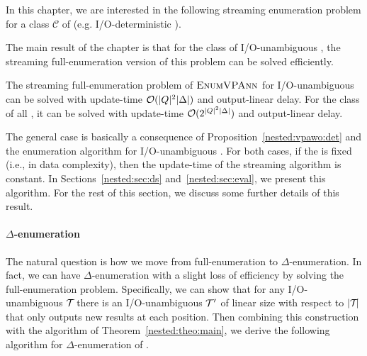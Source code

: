  
In this chapter, we are interested in the following streaming enumeration problem for a class $\mathcal{C}$ of \vpann (e.g. I/O-deterministic \vpann).
\begin{center}
\end{center}
The main result of the chapter is that for the class of I/O-unambiguous \vpann, the streaming full-enumeration version of this problem can be solved efficiently. %
\begin{theorem}\label{nested:theo:main}
	The streaming full-enumeration problem of $\textsc{EnumVPAnn}$ for I/O-unambiguous \vpann can be solved with update-time $\mathcal{O}(|Q|^2\vert\Delta\vert)$ and output-linear delay. For the class of all \vpann, it can be solved with update-time $\mathcal{O}(2^{|Q|^2\vert\Delta\vert})$ and output-linear \nolinebreak delay. 
\end{theorem} 
The general case is basically a consequence of Proposition~\ref{nested:vpawo:det} and the enumeration algorithm for I/O-unambiguous \vpann. For both cases, if the \vpann is fixed (i.e., in data complexity), then the update-time of the streaming algorithm is constant. In Sections~\ref{nested:sec:ds} and~\ref{nested:sec:eval}, we present this algorithm. For the rest of this section, we discuss some further details of this result.

\paragraph{$\Delta$-enumeration} The natural question is how we move from full-enumeration to $\Delta$-enumeration. In fact, we can have $\Delta$-enumeration with a slight loss of efficiency by solving the full-enumeration problem. Specifically, we can show that for any I/O-unambiguous \vpann $\mathcal{T}\!$ there is an I/O-unambiguous \vpann $\mathcal{T}\!\,'$ of linear size with respect to $|\mathcal{T}\!|$ that only outputs new results at each position. Then combining this construction with the algorithm of Theorem~\ref{nested:theo:main}, we derive the following algorithm for $\Delta$-enumeration of \vpann.


